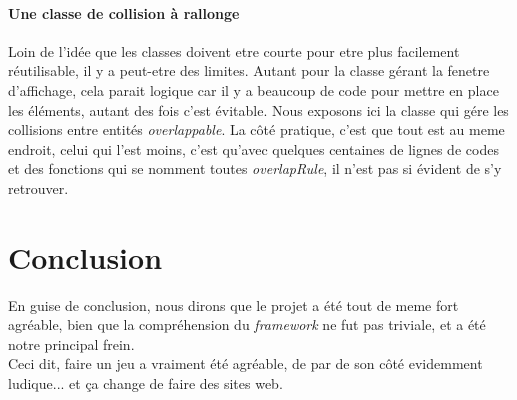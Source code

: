 \documentclass[a4paper,10pt]{article}
\begin{document}
    \paragraph{Une classe de collision à rallonge}
        Loin de l'idée que les classes doivent etre courte pour etre plus facilement réutilisable, il y a peut-etre
        des limites. Autant pour la classe gérant la fenetre d'affichage, cela parait logique car il y a beaucoup
        de code pour mettre en place les éléments, autant des fois c'est évitable. Nous exposons ici la classe
        qui gére les collisions entre entités \textit{overlappable}. La côté pratique, c'est que tout est au
        meme endroit, celui qui l'est moins, c'est qu'avec quelques centaines de lignes de codes et des fonctions
        qui se nomment toutes \textit{overlapRule}, il n'est pas si évident de s'y retrouver.


\section{Conclusion}
    En guise de conclusion, nous dirons que le projet a été tout de meme fort agréable, bien que la compréhension
    du \textit{framework} ne fut pas triviale, et a été notre principal frein.  \\
    Ceci dit, faire un jeu
    a vraiment été agréable, de par de son côté evidemment ludique... et ça change de faire des sites web.
\end{document}
